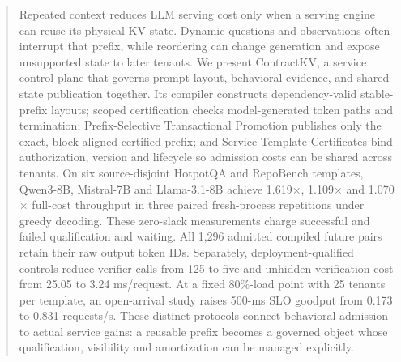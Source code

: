 \begin{abstract}
Repeated context reduces LLM serving cost only when a serving engine can reuse its physical KV state. Dynamic questions and observations often interrupt that prefix, while reordering can change generation and expose unsupported state to later tenants. We present ContractKV, a service control plane that governs prompt layout, behavioral evidence, and shared-state publication together. Its compiler constructs dependency-valid stable-prefix layouts; scoped certification checks model-generated token paths and termination; Prefix-Selective Transactional Promotion publishes only the exact, block-aligned certified prefix; and Service-Template Certificates bind authorization, version and lifecycle so admission costs can be shared across tenants. On six source-disjoint HotpotQA and RepoBench templates, Qwen3-8B, Mistral-7B and Llama-3.1-8B achieve 1.619$\times$, 1.109$\times$ and 1.070$\times$ full-cost throughput in three paired fresh-process repetitions under greedy decoding. These zero-slack measurements charge successful and failed qualification and waiting. All 1,296 admitted compiled future pairs retain their raw output token IDs. Separately, deployment-qualified controls reduce verifier calls from 125 to five and unhidden verification cost from 25.05 to 3.24 ms/request. At a fixed 80\%-load point with 25 tenants per template, an open-arrival study raises 500-ms SLO goodput from 0.173 to 0.831 requests/s. These distinct protocols connect behavioral admission to actual service gains: a reusable prefix becomes a governed object whose qualification, visibility and amortization can be managed explicitly.
\end{abstract}
